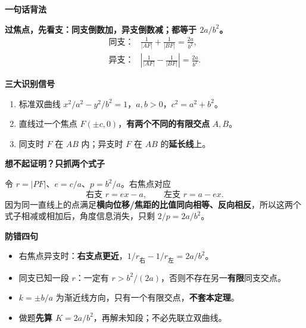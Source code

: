 \begin{summarybox}
  \textbf{\textcolor{CSummary}{一句话背法}}

  \textbf{过焦点，先看支：同支倒数加，异支倒数减；都等于 $2a/b^2$。}
  \[
    \boxed{\begin{array}{ll}
       \text{同支：}&\displaystyle\frac1{|AF|}+\frac1{|BF|}=\frac{2a}{b^2},\\[7pt]
       \text{异支：}&\displaystyle\left|\frac1{|AF|}-\frac1{|BF|}\right|=\frac{2a}{b^2}.
    \end{array}}
  \]

  \medskip
  \textbf{\textcolor{CSummary}{三大识别信号}}
  \begin{enumerate}[leftmargin=*,itemsep=0.35em,topsep=0.3em]
    \item 标准双曲线 $x^2/a^2-y^2/b^2=1$，$a,b>0$，$c^2=a^2+b^2$。
    \item 直线过一个焦点 $F(\pm c,0)$，\textbf{有两个不同的有限交点} $A,B$。
    \item 同支时 $F$ 在 $AB$ 内；异支时 $F$ 在 $AB$ 的\textbf{延长线}上。
  \end{enumerate}

  \medskip
  \textbf{\textcolor{CSummary}{想不起证明？只抓两个式子}}

  令 $r=|PF|$、$e=c/a$、$p=b^2/a$。右焦点对应
  \[
    \text{右支 }r=ex-a,\qquad \text{左支 }r=a-ex.
  \]
  因为同一直线上的点满足\textbf{横向位移/焦距的比值同向相等、反向相反}，所以这两个式子相减或相加后，角度信息消失，只剩 $2/p=2a/b^2$。

  \medskip
  \textbf{\textcolor{CSummary}{防错四句}}
  \begin{itemize}[leftmargin=*,itemsep=0.3em,topsep=0.3em]
    \item 右焦点异支时：\textbf{右支点更近}，$1/r_{\text{右}}-1/r_{\text{左}}=2a/b^2$。
    \item 同支已知一段 $r$：一定有 $r>b^2/(2a)$，否则不存在另一\textbf{有限}同支交点。
    \item $k=\pm b/a$ 为渐近线方向，只有一个有限交点，\textbf{不套本定理}。
    \item 做题\textbf{先算 $K=2a/b^2$}，再解未知段；不必先联立双曲线。
  \end{itemize}
\end{summarybox}
